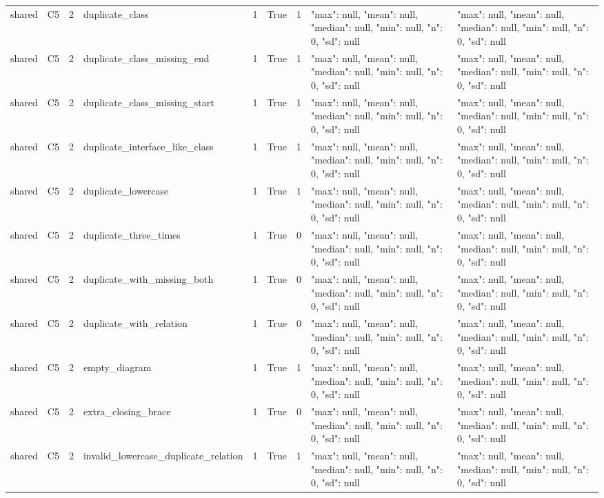 \begin{tabular}{lllllllll}
shared & C5 & 2 & duplicate\_class & 1 & True & 1 & {"max": null, "mean": null, "median": null, "min": null, "n": 0, "sd": null} & {"max": null, "mean": null, "median": null, "min": null, "n": 0, "sd": null} \\
shared & C5 & 2 & duplicate\_class\_missing\_end & 1 & True & 1 & {"max": null, "mean": null, "median": null, "min": null, "n": 0, "sd": null} & {"max": null, "mean": null, "median": null, "min": null, "n": 0, "sd": null} \\
shared & C5 & 2 & duplicate\_class\_missing\_start & 1 & True & 1 & {"max": null, "mean": null, "median": null, "min": null, "n": 0, "sd": null} & {"max": null, "mean": null, "median": null, "min": null, "n": 0, "sd": null} \\
shared & C5 & 2 & duplicate\_interface\_like\_class & 1 & True & 1 & {"max": null, "mean": null, "median": null, "min": null, "n": 0, "sd": null} & {"max": null, "mean": null, "median": null, "min": null, "n": 0, "sd": null} \\
shared & C5 & 2 & duplicate\_lowercase & 1 & True & 1 & {"max": null, "mean": null, "median": null, "min": null, "n": 0, "sd": null} & {"max": null, "mean": null, "median": null, "min": null, "n": 0, "sd": null} \\
shared & C5 & 2 & duplicate\_three\_times & 1 & True & 0 & {"max": null, "mean": null, "median": null, "min": null, "n": 0, "sd": null} & {"max": null, "mean": null, "median": null, "min": null, "n": 0, "sd": null} \\
shared & C5 & 2 & duplicate\_with\_missing\_both & 1 & True & 0 & {"max": null, "mean": null, "median": null, "min": null, "n": 0, "sd": null} & {"max": null, "mean": null, "median": null, "min": null, "n": 0, "sd": null} \\
shared & C5 & 2 & duplicate\_with\_relation & 1 & True & 0 & {"max": null, "mean": null, "median": null, "min": null, "n": 0, "sd": null} & {"max": null, "mean": null, "median": null, "min": null, "n": 0, "sd": null} \\
shared & C5 & 2 & empty\_diagram & 1 & True & 1 & {"max": null, "mean": null, "median": null, "min": null, "n": 0, "sd": null} & {"max": null, "mean": null, "median": null, "min": null, "n": 0, "sd": null} \\
shared & C5 & 2 & extra\_closing\_brace & 1 & True & 0 & {"max": null, "mean": null, "median": null, "min": null, "n": 0, "sd": null} & {"max": null, "mean": null, "median": null, "min": null, "n": 0, "sd": null} \\
shared & C5 & 2 & invalid\_lowercase\_duplicate\_relation & 1 & True & 1 & {"max": null, "mean": null, "median": null, "min": null, "n": 0, "sd": null} & {"max": null, "mean": null, "median": null, "min": null, "n": 0, "sd": null} \\

\end{tabular}
